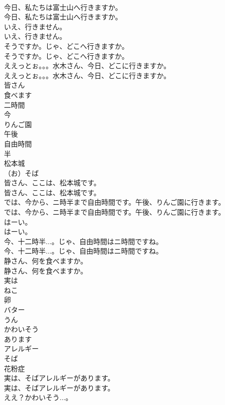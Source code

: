 \documentclass[8pt]{extreport}
\begin{document}
\begin{CJK}{UTF8}{min}
\\	今日、私たちは富士山へ行きますか。	
\\	今日、私たちは富士山へ行きますか。 
\\	いえ、行きません。	
\\	いえ、行きません。 
\\	そうですか。じゃ、どこへ行きますか。	
\\	そうですか。じゃ、どこへ行きますか。 
\\	ええっとぉ。。。水木さん、今日、どこに行きますか。	
\\	ええっとぉ。。。水木さん、今日、どこに行きますか。 
\\	皆さん
\\	食べます
\\	二時間
\\	今
\\	りんご園
\\	午後
\\	自由時間
\\	半
\\	松本城
\\	（お）そば
\\	皆さん、ここは、松本城です。	
\\	皆さん、ここは、松本城です。 
\\	では、今から、ニ時半まで自由時間です。午後、りんご園に行きます。	
\\	では、今から、ニ時半まで自由時間です。午後、りんご園に行きます。 
\\	はーい。	
\\	はーい。 
\\	今、十二時半...。じゃ、自由時間はニ時間ですね。	
\\	今、十二時半...。じゃ、自由時間はニ時間ですね。 
\\	静さん、何を食べますか。	
\\	静さん、何を食べますか。 
\\	実は
\\	ねこ
\\	卵
\\	バター
\\	うん
\\	かわいそう
\\	あります
\\	アレルギー
\\	そば
\\	花粉症
\\	実は、そばアレルギーがあります。	
\\	実は、そばアレルギーがあります。 
\\	ええ？かわいそう...。	

\end{CJK}
\end{document}
